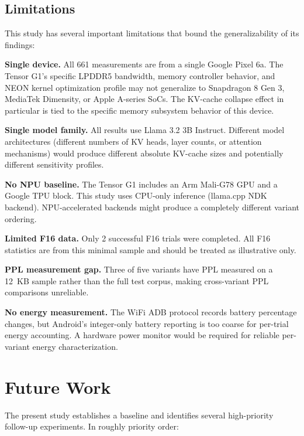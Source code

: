 \documentclass[conference]{IEEEtran}
\begin{document}
\subsection{Limitations}

This study has several important limitations that bound the generalizability
of its findings:

\textbf{Single device.} All 661 measurements are from a single Google Pixel 6a.
The Tensor G1's specific LPDDR5 bandwidth, memory controller behavior, and
NEON kernel optimization profile may not generalize to Snapdragon 8 Gen 3,
MediaTek Dimensity, or Apple A-series SoCs. The KV-cache collapse effect in
particular is tied to the specific memory subsystem behavior of this device.

\textbf{Single model family.} All results use Llama 3.2 3B Instruct.
Different model architectures (different numbers of KV heads, layer counts,
or attention mechanisms) would produce different absolute KV-cache sizes and
potentially different sensitivity profiles.

\textbf{No NPU baseline.} The Tensor G1 includes an Arm Mali-G78 GPU and a
Google TPU block. This study uses CPU-only inference (llama.cpp NDK backend).
NPU-accelerated backends might produce a completely different variant ordering.

\textbf{Limited F16 data.} Only 2 successful F16 trials were completed. All
F16 statistics are from this minimal sample and should be treated as
illustrative only.

\textbf{PPL measurement gap.} Three of five variants have PPL measured on a
12~KB sample rather than the full test corpus, making cross-variant PPL
comparisons unreliable.

\textbf{No energy measurement.} The WiFi ADB protocol records battery
percentage changes, but Android's integer-only battery reporting is too
coarse for per-trial energy accounting. A hardware power monitor would be
required for reliable per-variant energy characterization.

\section{Future Work}
\label{sec:future}

The present study establishes a baseline and identifies several high-priority
follow-up experiments. In roughly priority order:
\end{document}
